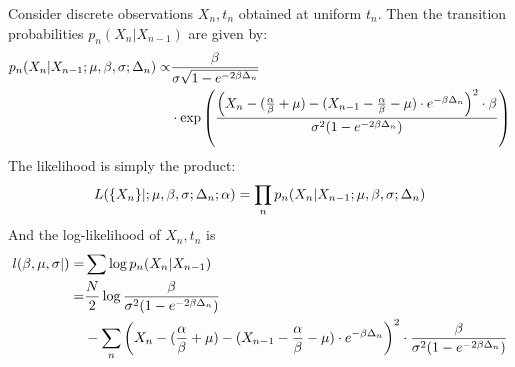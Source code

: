 \documentclass{article}
\begin{document}
Consider discrete observations ${X_n, t_n}$ obtained at uniform
$t_n$.
Then the transition probabilities $p_n(X_n|X_{n-1})$ are given by:
\begin{align*}
p_n(X_n|X_{n-1}; {\mu },{\beta}, {\sigma }; \Delta_n) \propto &
\frac{{\beta}}{{\sigma } \sqrt{1 -  e^{-2{\beta} \Delta_n}}}
\\ &\cdot 
\exp\left(\frac{\left( X_n - (\frac {{\alpha}}{{\beta}} + \mu)  - (X_{n-1} - \frac {{\alpha}}{{\beta}} - \mu) \cdot
e^{-{\beta} \Delta_n} \right)^2 \cdot {\beta}}
			{ {\sigma }^2  (1-e^{-2{\beta}\Delta_n})} \right)
\end{align*}
The likelihood is simply the product:
\begin{equation}
L( \{X_n\}| ; {\mu },{\beta}, {\sigma }; \Delta_n; {\alpha}) = \prod_n p_n(X_n|X_{n-1}; {\mu },{\beta}, {\sigma };
\Delta_n)
\label{eq:Likelihood_OU}
\end{equation}
And the log-likelihood of  ${X_n, t_n}$ is
\begin{align*}
l({\beta}, {\mu }, {\sigma } | )=& \sum \log p_n(X_n|X_{n-1})
\\
=& \frac{N}{2} \log \frac{{\beta}}{{\sigma }^2(1-e^{-2{\beta}\Delta_n})}
\\ & -\sum_n
{\left( X_n - (\frac {{\alpha}}{{\beta}} + \mu)  - 
		(X_{n-1} - \frac {{\alpha}}{{\beta}} - \mu) \cdot e^{-{\beta} \Delta_n} \right)^2 } \cdot
				\frac{{\beta}}{{\sigma }^2  (1-e^{-2{\beta}\Delta_n})}
\end{align*}

\def \Xn {{ X_n }}
\def \Xm {{ X_{n-1} }}
\def \deltan {{ \Delta_n }}
\end{document}
